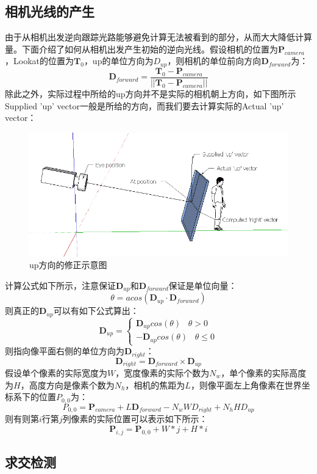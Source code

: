 \documentclass[10pt]{article}
\begin{document}
\subsection{相机光线的产生}
由于从相机出发逆向跟踪光路能够避免计算无法被看到的部分，从而大大降低计算量。下面介绍了如何从相机出发产生初始的逆向光线。假设相机的位置为$\bm{P}_{camera}$，Lookat的位置为$\bm{T}_0$，up的单位方向为$D_{up}$，则相机的单位前向方向$\bm{D}_{forward}$为：
$$\bm{D}_{forward}=\frac{\bm{T}_0-\bm{P}_{camera}}{||\bm{T}_0-\bm{P}_{camera}||}$$
除此之外，实际过程中所给的up方向并不是实际的相机朝上方向，如下图所示Supplied 'up' vector一般是所给的方向，而我们要去计算实际的Actual 'up' vector：
\begin{figure}[H]
\begin{center}
\includegraphics[scale=0.4]{up_adjust.png}
\caption{up方向的修正示意图}
\end{center}
\end{figure}
计算公式如下所示，注意保证$\bm{D}_{up}$和$\bm{D}_{forward}$保证是单位向量：
$$\theta=acos(\bm{D}_{up} \cdot \bm{D}_{forward})$$
则真正的$\bm{D}_{up}$可以有如下公式算出：
$$
\bm{D}_{up}=\left\{
\begin{array}{rl}
\bm{D}_{up}cos(\theta) \hspace{10pt} \theta >0 \\
-\bm{D}_{up}cos(\theta) \hspace{10pt} \theta \leq 0
\end{array}
\right.
$$
则指向像平面右侧的单位方向为$\bm{D}_{right}$：
$$\bm{D}_{right}=\bm{D}_{forward} \times \bm{D}_{up}$$
假设单个像素的实际宽度为$W$，宽度像素的实际个数为$N_{w}$，单个像素的实际高度为$H$，高度方向是像素个数为$N_{h}$，相机的焦距为$L$，则像平面左上角像素在世界坐标系下的位置$P_{0,0}$为：
$$P_{0,0}=\bm{P}_{camera}+L\bm{D}_{forward}-N_{w}WD_{right}+N_{h}HD_{up}$$
则有则第$i$行第$j$列像素的实际位置可以表示如下所示：
$$\bm{P}_{i,j}=\bm{P}_{0,0}+W*j+H*i$$
\subsection{求交检测}
\end{document}
